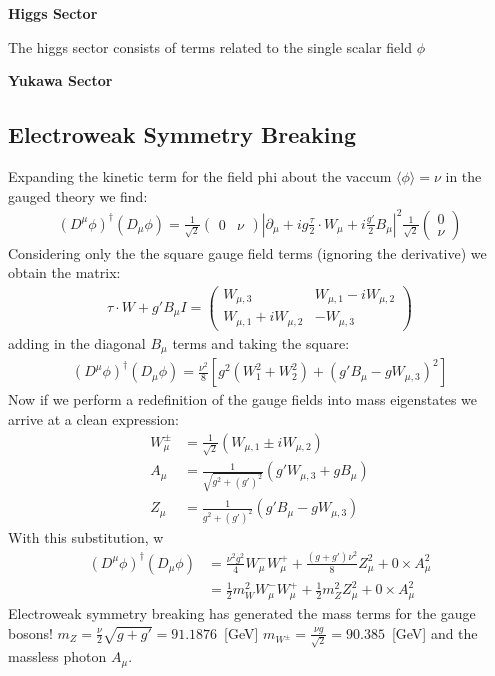 \textbf{Higgs Sector}

The higgs sector consists of terms related to the single scalar field $\phi$

\textbf{Yukawa Sector}

\subsection{Electroweak Symmetry Breaking}

Expanding the kinetic term for the field phi about the vaccum $\langle \phi \rangle = \nu$ in the gauged theory we find:
\begin{align*}
(D^\mu \phi)^\dagger (D_\mu \phi) = \frac{1}{\sqrt{2}} \left (\begin{array}{cc} 0  & \nu \end{array} \right )  \left | \partial_\mu + i g \frac{\tau}{2} \cdot W_\mu + i \frac{g'}{2} B_\mu \right|^2  \frac{1}{\sqrt{2}} \left (\begin{array}{c} 0 \\ \nu \end{array} \right ) 
\end{align*}
Considering only the the square gauge field terms (ignoring the derivative)  we obtain the matrix:
\begin{align*}
\tau \cdot W + g'B_\mu I = \left (\begin{array}{cc} W_{\mu,3} & W_{\mu,1} - i W_{\mu,2}  \\ W_{\mu,1}+ i W_{\mu,2} & - W_{\mu,3} \end{array} \right )
\end{align*}
adding in the diagonal $B_\mu$ terms and taking the square:
\begin{align*}
(D^\mu \phi)^\dagger (D_\mu \phi) = \frac{\nu^2}{8} \left [g^2 (W_1^2 + W_2^2) + (g' B_\mu - g W_{\mu,3})^2 \right]
\end{align*}
Now if we perform a redefinition of the gauge fields into mass eigenstates we arrive at a clean expression:
\begin{align*}
W_{\mu}^{\pm} &= \frac{1}{\sqrt{2}}( W_{\mu,1}  \pm i W_{\mu,2} ) \\
A_{\mu} &= \frac{1}{\sqrt{g^2 + (g')^2}} (g' W_{\mu,3} + g B_\mu)\\
Z_{\mu} &= \frac{1}{g^2 + (g')^2}( g' B_\mu - g W_{\mu,3}) 
\end{align*}
With this substitution, w
\begin{align*}
(D^\mu \phi)^\dagger (D_\mu \phi) &= \frac{\nu^2 g^2}{4} W_{\mu}^{-} W_{\mu}^{+} + \frac{(g+g')\nu^2}{8} Z_\mu^2  + 0 \times A_\mu^2 \\ 
&= \frac{1}{2} m_{W}^2 W_\mu^- W_\mu^+ + \frac{1}{2} m_Z^2 Z_\mu^2  + 0 \times A_\mu^2
\end{align*}
Electroweak symmetry breaking has generated the mass terms for the gauge bosons! $m_Z = \frac{\nu}{2}\sqrt{g+g'} = 91.1876$~[GeV] 
$m_{W^{\pm}} = \frac{\nu g}{\sqrt{2}} = 90.385$~[GeV] and the massless photon $A_\mu$. 

